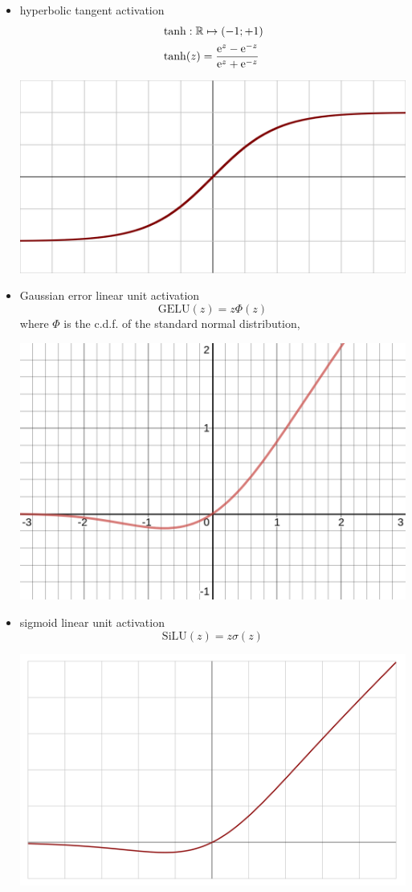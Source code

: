 \documentclass{myclass}
\begin{document}
\begin{itemize}
   \item hyperbolic tangent activation
   \[
   \begin{split}
      &\tanh: \mathbb{R} \mapsto (-1;+1)\\
      &\tanh(z) = \frac{\mathrm{e}^{z} - \mathrm{e}^{-z}}{\mathrm{e}^{z} + \mathrm{e}^{-z}}
   \end{split}
   \]
   \begin{center}
   \includegraphics[width=0.5\columnwidth]{figs/Activation_tanh.svg.png}
   \end{center}

   \item Gaussian error linear unit activation
   \[
      \text{GELU}(z) = z \Phi(z)
   \]
   where $\Phi$ is the c.d.f. of the standard normal distribution,
   \begin{center}
   \includegraphics[width=0.5\columnwidth]{figs/Activation_gelu.png}
   \end{center}

   \item sigmoid linear unit activation
   \[
      \text{SiLU}(z) = z \sigma(z)
   \]
   \begin{center}
   \includegraphics[width=0.5\columnwidth]{figs/Swish.svg.png}
   \end{center}

\end{itemize}
\end{document}
